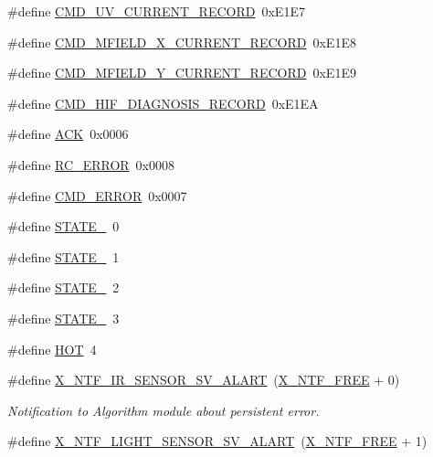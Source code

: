 \begin{DoxyCompactItemize}
\item 
\#define \hyperlink{a00021_ab0e0364ddc2d95d1e5b51a3e3ff50918}{C\+M\+D\+\_\+\+U\+V\+\_\+\+C\+U\+R\+R\+E\+N\+T\+\_\+\+R\+E\+C\+O\+R\+D}~0x\+E1\+E7
\item 
\#define \hyperlink{a00021_ab796345ffdbc6a240b67b56583bb77c6}{C\+M\+D\+\_\+\+M\+F\+I\+E\+L\+D\+\_\+\+X\+\_\+\+C\+U\+R\+R\+E\+N\+T\+\_\+\+R\+E\+C\+O\+R\+D}~0x\+E1\+E8
\item 
\#define \hyperlink{a00021_a8ddac7f7a2a90f2d8535af02e338b1bf}{C\+M\+D\+\_\+\+M\+F\+I\+E\+L\+D\+\_\+\+Y\+\_\+\+C\+U\+R\+R\+E\+N\+T\+\_\+\+R\+E\+C\+O\+R\+D}~0x\+E1\+E9
\item 
\#define \hyperlink{a00021_a185ed5442d69c7c8abba13323a8e8187}{C\+M\+D\+\_\+\+H\+I\+F\+\_\+\+D\+I\+A\+G\+N\+O\+S\+I\+S\+\_\+\+R\+E\+C\+O\+R\+D}~0x\+E1\+E\+A
\item 
\#define \hyperlink{a00021_a6f6489887e08bff4887d0bc5dcf214d8}{A\+C\+K}~0x0006
\item 
\#define \hyperlink{a00021_a993a04d3d34ab3326d1786c66e3aaa1a}{R\+C\+\_\+\+E\+R\+R\+O\+R}~0x0008
\item 
\#define \hyperlink{a00021_a1764a522e9c1a59a59be8757c69fa494}{C\+M\+D\+\_\+\+E\+R\+R\+O\+R}~0x0007
\item 
\#define \hyperlink{a00021_ad6739dbbe5581cac99b7dc8a5e09949c}{S\+T\+A\+T\+E\+\_}~0
\item 
\#define \hyperlink{a00021_a727351838367f27ac0adb9a13422c342}{S\+T\+A\+T\+E\+\_}~1
\item 
\#define \hyperlink{a00021_a66fa48e832a64af4d405511cecc4c752}{S\+T\+A\+T\+E\+\_}~2
\item 
\#define \hyperlink{a00021_ad87f1bc8466a25d9f7da68717d324a22}{S\+T\+A\+T\+E\+\_}~3
\item 
\#define \hyperlink{a00021_a1eb14cc432874ddacd1934791dbe12a3}{H\+O\+T}~4
\item 
\#define \hyperlink{a00021_a0eb06525326cff5fc0fb38f141d6be8e}{X\+\_\+\+N\+T\+F\+\_\+\+I\+R\+\_\+\+S\+E\+N\+S\+O\+R\+\_\+\+S\+V\+\_\+\+A\+L\+A\+R\+T}~(\hyperlink{a00036_ab2eeea4643823a0c7c7731ddb83e3edc}{X\+\_\+\+N\+T\+F\+\_\+\+F\+R\+E\+E} + 0)
\begin{DoxyCompactList}\small\item\em Notification to Algorithm module about persistent error. \end{DoxyCompactList}\item 
\#define \hyperlink{a00021_a472c0187f61238cdef62bf3d965df8e2}{X\+\_\+\+N\+T\+F\+\_\+\+L\+I\+G\+H\+T\+\_\+\+S\+E\+N\+S\+O\+R\+\_\+\+S\+V\+\_\+\+A\+L\+A\+R\+T}~(\hyperlink{a00036_ab2eeea4643823a0c7c7731ddb83e3edc}{X\+\_\+\+N\+T\+F\+\_\+\+F\+R\+E\+E} + 1)

\end{DoxyCompactItemize}
